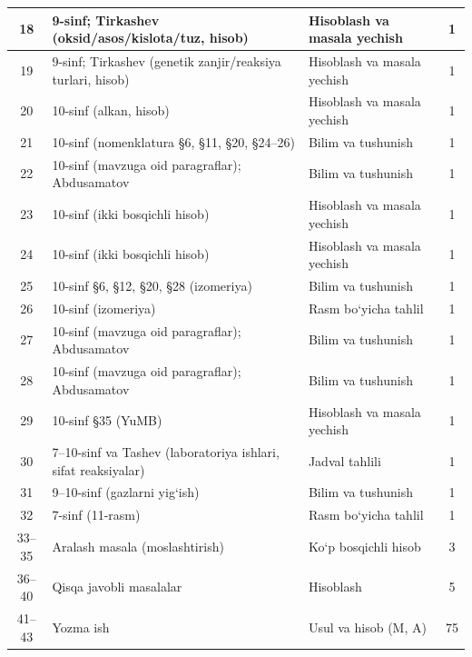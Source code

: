 \documentclass[11pt,a4paper]{article}
\begin{document}
{\begin{longtable}{|c|p{7.2cm}|p{5.4cm}|c|}
18 & 9-sinf; Tirkashev (oksid/asos/kislota/tuz, hisob) & Hisoblash va masala yechish & 1\\\hline
19 & 9-sinf; Tirkashev (genetik zanjir/reaksiya turlari, hisob) & Hisoblash va masala yechish & 1\\\hline
20 & 10-sinf (alkan, hisob) & Hisoblash va masala yechish & 1\\\hline
21 & 10-sinf (nomenklatura \S{}6, \S{}11, \S{}20, \S{}24--26) & Bilim va tushunish & 1\\\hline
22 & 10-sinf (mavzuga oid paragraflar); Abdusamatov & Bilim va tushunish & 1\\\hline
23 & 10-sinf (ikki bosqichli hisob) & Hisoblash va masala yechish & 1\\\hline
24 & 10-sinf (ikki bosqichli hisob) & Hisoblash va masala yechish & 1\\\hline
25 & 10-sinf \S{}6, \S{}12, \S{}20, \S{}28 (izomeriya) & Bilim va tushunish & 1\\\hline
26 & 10-sinf (izomeriya) & Rasm bo`yicha tahlil & 1\\\hline
27 & 10-sinf (mavzuga oid paragraflar); Abdusamatov & Bilim va tushunish & 1\\\hline
28 & 10-sinf (mavzuga oid paragraflar); Abdusamatov & Bilim va tushunish & 1\\\hline
29 & 10-sinf \S{}35 (YuMB) & Hisoblash va masala yechish & 1\\\hline
30 & 7--10-sinf va Tashev (laboratoriya ishlari, sifat reaksiyalar) & Jadval tahlili & 1\\\hline
31 & 9--10-sinf (gazlarni yig`ish) & Bilim va tushunish & 1\\\hline
32 & 7-sinf (11-rasm) & Rasm bo`yicha tahlil & 1\\\hline
33--35 & Aralash masala (moslashtirish) & Ko`p bosqichli hisob & 3\\\hline
36--40 & Qisqa javobli masalalar & Hisoblash & 5\\\hline
41--43 & Yozma ish & Usul va hisob (M, A) & 75\\\hline
\end{longtable}}
\end{document}
